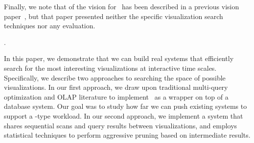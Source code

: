 Finally, we note that of the vision for \SeeDB\ has been described in a previous vision paper~\cite{DBLP:conf/vldb/Parameswaran2013}, but
that paper presented neither the specific visualization search techniques nor any evaluation.





.

In this paper, we demonstrate that we can build real systems that efficiently search for the most
interesting visualizations at interactive time scales.
Specifically, we describe two approaches to searching the space of possible visualizations.
In our first approach, we draw upon traditional multi-query optimization and OLAP literature to implement \SeeDB\ 
as a wrapper on top of a database system. Our goal was to study how far we can push existing systems to support a
\SeeDB-type workload.
In our second approach, we implement a system that  shares sequential scans and query results between visualizations, and 
employs statistical techniques to perform aggressive pruning based on intermediate results.

